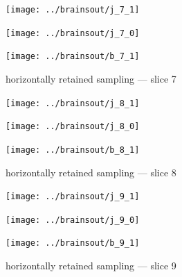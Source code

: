 \documentclass{article}
\begin{document}
\begin{figure}
\begin{centering}

\parbox{\imsize}{\texttt{[image: ../brainsout/j\_7\_1]}}

\vspace{\vertsep}

\parbox{\imsize}{\texttt{[image: ../brainsout/j\_7\_0]}}

\vspace{\vertsep}

\parbox{\imsize}{\texttt{[image: ../brainsout/b\_7\_1]}}

\end{centering}
\caption{horizontally retained sampling --- slice 7}
\end{figure}


\begin{figure}
\begin{centering}

\parbox{\imsize}{\texttt{[image: ../brainsout/j\_8\_1]}}

\vspace{\vertsep}

\parbox{\imsize}{\texttt{[image: ../brainsout/j\_8\_0]}}

\vspace{\vertsep}

\parbox{\imsize}{\texttt{[image: ../brainsout/b\_8\_1]}}

\end{centering}
\caption{horizontally retained sampling --- slice 8}
\end{figure}


\begin{figure}
\begin{centering}

\parbox{\imsize}{\texttt{[image: ../brainsout/j\_9\_1]}}

\vspace{\vertsep}

\parbox{\imsize}{\texttt{[image: ../brainsout/j\_9\_0]}}

\vspace{\vertsep}

\parbox{\imsize}{\texttt{[image: ../brainsout/b\_9\_1]}}

\end{centering}
\caption{horizontally retained sampling --- slice 9}
\end{figure}
\end{document}
